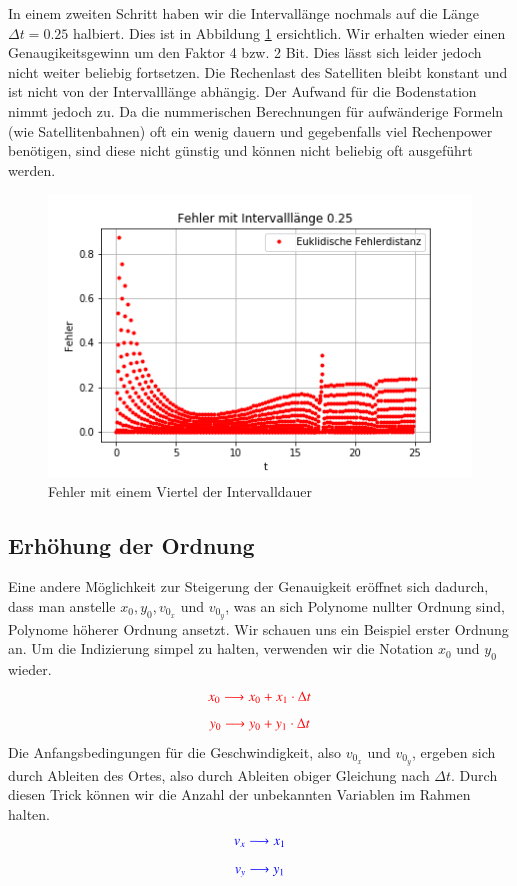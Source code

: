 In einem zweiten Schritt haben wir die Intervallänge nochmals auf die Länge $\Delta t = 0.25$ halbiert. 
Dies ist in Abbildung \ref{errorShortInterval2} ersichtlich. 
Wir erhalten wieder einen Genaugikeitsgewinn um den Faktor 4 bzw. 2 Bit. 
Dies lässt sich leider jedoch nicht weiter beliebig fortsetzen. 
Die Rechenlast des Satelliten bleibt konstant und ist nicht von der Intervalllänge abhängig. 
Der Aufwand für die Bodenstation nimmt jedoch zu. 
Da die nummerischen Berechnungen für aufwänderige Formeln (wie Satellitenbahnen) oft ein wenig dauern und gegebenfalls viel Rechenpower benötigen, sind diese nicht günstig und können nicht beliebig oft ausgeführt werden.

\begin{figure}
    \centering
    \includegraphics[scale=0.7]{papers/perturbation/bilder/viertelintervall.png}
    \caption{Fehler mit einem Viertel der Intervalldauer}
	\label{errorShortInterval2}
\end{figure}

\subsection{Erhöhung der Ordnung}
Eine andere Möglichkeit zur Steigerung der Genauigkeit eröffnet sich dadurch, dass man anstelle $x_0, y_0, v_{0_x}$ und $v_{0_y}$, was an sich Polynome nullter Ordnung sind, Polynome höherer Ordnung ansetzt. 
Wir schauen uns ein Beispiel erster Ordnung an. 
Um die Indizierung simpel zu halten, verwenden wir die Notation $x_0$ und $y_0$ wieder.
\[
\textcolor{red}{x_0 \longrightarrow x_0 +   x_1  \cdot \Delta t}
\]
\[
\textcolor{red}{y_0 \longrightarrow y_0 +   y_1  \cdot \Delta t}
\]
Die Anfangsbedingungen für die Geschwindigkeit, also $v_{0_x}$ und $v_{0_y}$, ergeben sich durch Ableiten des Ortes, also durch Ableiten obiger Gleichung nach $\Delta t$. 
Durch diesen Trick können wir die Anzahl der unbekannten Variablen im Rahmen halten.
\[
\textcolor{blue}{v_x \longrightarrow x_1}
\]
\[
\textcolor{blue}{v_y \longrightarrow y_1}
\]

